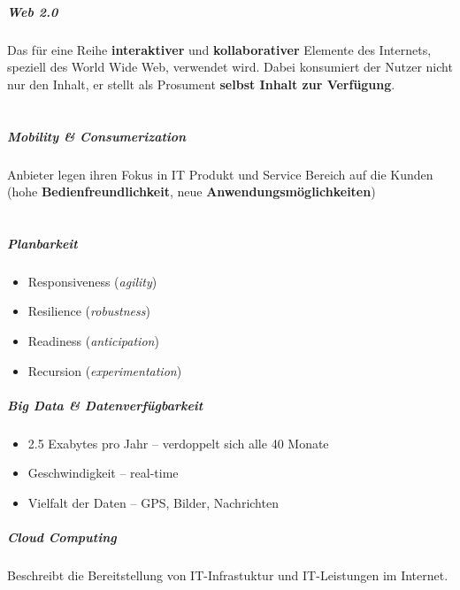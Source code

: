 \documentclass[a4paper]{article}
\newenvironment*{dummyenv}{}{}
\begin{document}
\subsubsection*{Web 2.0}
Das für eine Reihe \textbf{interaktiver} und \textbf{kollaborativer} Elemente des Internets, speziell des World Wide Web, verwendet wird. Dabei konsumiert der Nutzer nicht nur den Inhalt, er stellt als Prosument \textbf{selbst Inhalt zur Verfügung}.
\part*{}
\hrulefill
\subsubsection*{Mobility \& Consumerization}
Anbieter legen ihren Fokus in IT Produkt und Service Bereich auf die Kunden (hohe \textbf{Bedienfreundlichkeit}, neue \textbf{Anwendungsmöglichkeiten})
\part*{}
\hrulefill

\subsubsection*{Planbarkeit}
\begin{itemize}
	\item Responsiveness (\textit{agility})
	\item Resilience (\textit{robustness}) 
	\item Readiness (\textit{anticipation}) 
	\item Recursion (\textit{experimentation})
\end{itemize}
\hrulefill

\subsubsection*{Big Data \& Datenverfügbarkeit}
\begin{itemize}
	\item 2.5 Exabytes pro Jahr -- verdoppelt sich alle 40 Monate
	\item Geschwindigkeit -- real-time
	\item Vielfalt der Daten -- GPS, Bilder, Nachrichten
\end{itemize}
\hrulefill

\subsubsection*{Cloud Computing}
Beschreibt die Bereitstellung von IT-Infrastuktur und IT-Leistungen im Internet.
\end{document}
